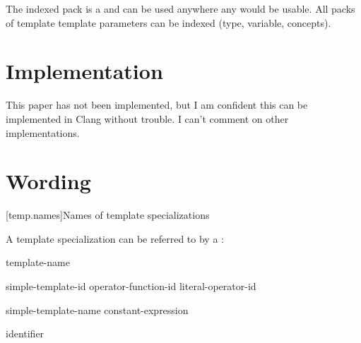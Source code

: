 \documentclass{wg21}
\begin{document}
The indexed pack is a  and can be used anywhere any 
would be usable.
All packs of template template parameters can be indexed (type, variable, concepts).

\section{Implementation}

This paper has not been implemented, but I am confident this can be implemented in Clang without trouble.
I can't comment on other implementations.

\section{Wording}

[temp.names]{Names of template specializations}

\pnum
A template specialization can be referred to by a
:

\begin{bnf}
    \br
    template-name \terminal{<}  \terminal{>}
\end{bnf}

\begin{bnf}
    \br
    simple-template-id\br
    operator-function-id \terminal{<}  \terminal{>}\br
    literal-operator-id \terminal{<}  \terminal{>}
\end{bnf}

\begin{bnf}
    \br
     \br
    \br
\end{bnf}

\begin{addedblock}
\begin{bnf}
    \br
    simple-template-name  \terminal{[} constant-expression \terminal{]}
\end{bnf}

\begin{bnf}
    \br
    identifier
\end{bnf}
\end{addedblock}
\end{document}
